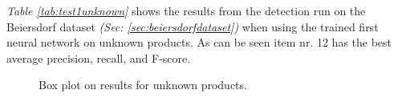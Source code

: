 \textit{Table \ref{tab:test1unknown}} shows the results from the detection run on the Beiersdorf dataset \textit{(Sec: \ref{sec:beiersdorfdataset})} when using the trained first neural network on unknown products. As can be seen item nr. 12 has the best average precision, recall, and F-score.

\clearpage

\begin{figure}[h]
 \centering
 \hfill
 
 \caption{Box plot on results for unknown products.}
 \label{fig:unknowniou}
\end{figure}

